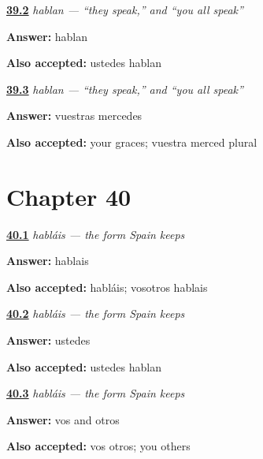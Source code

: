 \noindent\begin{minipage}[t]{\linewidth}
\raggedright
\hyperlink{review-ES-C07-hablan-ustedes}{\textbf{39.2}} \emph{hablan — \textquotedblleft{}they speak,\textquotedblright{} and \textquotedblleft{}you all speak\textquotedblright{}}\par
\small \textbf{Answer:} hablan\par
\footnotesize \textbf{Also accepted:} ustedes hablan
\end{minipage}\par\medskip

\noindent\begin{minipage}[t]{\linewidth}
\raggedright
\hyperlink{review-ES-C07-hablan-why}{\textbf{39.3}} \emph{hablan — \textquotedblleft{}they speak,\textquotedblright{} and \textquotedblleft{}you all speak\textquotedblright{}}\par
\small \textbf{Answer:} vuestras mercedes\par
\footnotesize \textbf{Also accepted:} your graces; vuestra merced plural
\end{minipage}\par\medskip

\section*{Chapter 40}

\noindent\begin{minipage}[t]{\linewidth}
\raggedright
\hyperlink{review-ES-C07-hablais-form}{\textbf{40.1}} \emph{habláis — the form Spain keeps}\par
\small \textbf{Answer:} hablais\par
\footnotesize \textbf{Also accepted:} habláis; vosotros hablais
\end{minipage}\par\medskip

\noindent\begin{minipage}[t]{\linewidth}
\raggedright
\hyperlink{review-ES-C07-hablais-where}{\textbf{40.2}} \emph{habláis — the form Spain keeps}\par
\small \textbf{Answer:} ustedes\par
\footnotesize \textbf{Also accepted:} ustedes hablan
\end{minipage}\par\medskip

\noindent\begin{minipage}[t]{\linewidth}
\raggedright
\hyperlink{review-ES-C07-hablais-why}{\textbf{40.3}} \emph{habláis — the form Spain keeps}\par
\small \textbf{Answer:} vos and otros\par
\footnotesize \textbf{Also accepted:} vos otros; you others
\end{minipage}\par\medskip

